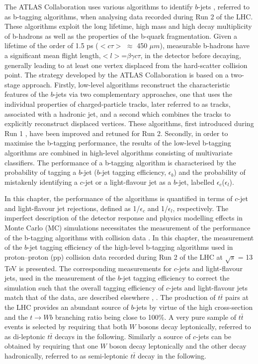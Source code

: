 \documentclass[letterpaper,12pt]{article}
\begin{document}
The ATLAS Collaboration uses various algorithms to identify $b$-jets \cite{PERF-2012-04}, referred to as b-tagging algorithms, when analysing data recorded during Run 2 of the LHC. These algorithms exploit the long lifetime, high mass and high decay multiplicity of b-hadrons as well as the properties of the b-quark fragmentation. Given a lifetime of the order of 1.5 ps ($<c\tau>$ $\approx$ 450 $\mu m$), measurable b-hadrons have a significant mean flight length,$<l>$=$\beta\gamma c\tau$, in the detector before decaying, generally leading to at least one vertex displaced from the hard-scatter collision point. The strategy developed by the ATLAS Collaboration is based on a two-stage approach. Firstly, low-level algorithms reconstruct the characteristic features of the $b$-jets via two complementary approaches, one that uses the individual properties of charged-particle tracks, later referred to as tracks, associated with a hadronic jet, and a second which combines the tracks to explicitly reconstruct displaced vertices. These algorithms, first introduced during Run 1 \cite{PERF-2012-04}, have been improved and retuned for Run 2. Secondly, in order to maximise the b-tagging performance, the results of the low-level b-tagging algorithms are combined in high-level algorithms consisting of multivariate classifiers. The performance of a b-tagging algorithm is characterised by the probability of tagging a $b$-jet ($b$-jet tagging efficiency, $\epsilon_b$) and the probability of mistakenly identifying a $c$-jet or a light-flavour jet as a $b$-jet, labelled $\epsilon_c$($\epsilon_l$). 

In this chapter, the performance of the algorithms is quantified in terms of $c$-jet and light-flavour jet rejections, defined as 1/$\epsilon_c$ and 1/$\epsilon_l$, respectively. The imperfect description of the detector response and physics modelling effects in Monte Carlo (MC) simulations necessitates the measurement of the performance of the b-tagging algorithms with collision data \cite{PERF-2012-04 ttbar,b-jet identification semi ttbar}. In this chapter, the measurement of the $b$-jet tagging efficiency of the high-level b-tagging algorithms used in proton–proton (pp) collision data recorded during Run 2 of the LHC at $\sqrt{s}$ = 13 TeV is presented. The corresponding measurements for $c$-jets and light-flavour jets, used in the measurement of the $b$-jet tagging efficiency to correct the simulation such that the overall tagging efficiency of $c$-jets and light-flavour jets match that of the data, are described elsewhere \cite{ATLAS-CONF-2018-006}, \cite{cjet}. The production of $t\bar{t}$ pairs at the LHC provides an abundant source of $b$-jets by virtue of the high cross-section and the $t \rightarrow Wb$ branching ratio being close to 100\%. A very pure sample of $t\bar{t}$ events is selected by requiring that both $W$ bosons decay leptonically, referred to as di-leptonic $t\bar{t}$ decays in the following. Similarly a source of $c$-jets can be obtained by requiring that one $W$ boson decay leptonically and the other decay hadronically, referred to as semi-leptonic $t\bar{t}$ decay in the following. 
\end{document}
